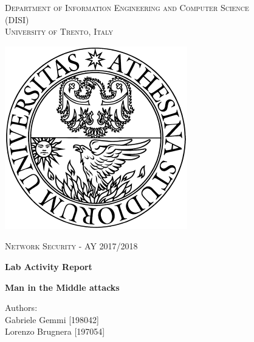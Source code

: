 \begin{titlepage}
	\begin{center}
   	{\scshape\LARGE
    	Department of Information Engineering and Computer Science\\
      	(DISI)\\
      	University of Trento, Italy\\\par}
      	\vspace{1cm}
      	\includegraphics[scale=0.35]{logo}\\
	\vspace{1cm}
	{\scshape\Large Network Security - AY 2017/2018 \par}
	\vspace{1cm}
	{\huge\bfseries Lab Activity Report\\\par}
	\noindent\makebox[\linewidth]{\rule{\linewidth}{0.4pt}}
	{\Large\bfseries Man in the Middle attacks\par}
      	\noindent\makebox[\linewidth]{\rule{\linewidth}{0.4pt}}

        \vspace{.5cm}
        Authors: \\
       	Gabriele Gemmi [198042] \\
				Lorenzo Brugnera [197054]
      	\vfill
      	\vfill
	\end{center}
\end{titlepage}
